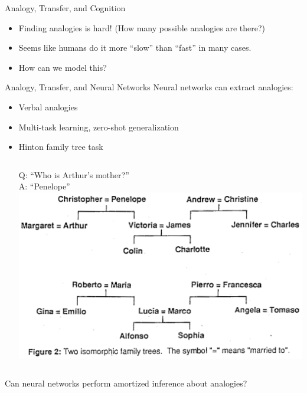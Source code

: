 \documentclass{beamer}
\begin{document}
\begin{frame}{Analogy, Transfer, and Cognition}
\begin{itemize}
    \item<1-> Finding analogies is hard! (How many possible analogies are there?)
    \item<2-> Seems like humans do it more ``slow'' than ``fast'' in many cases. 
    \item<3-> How can we model this?    
\end{itemize}
\end{frame}

\begin{frame}{Analogy, Transfer, and Neural Networks}
Neural networks can extract analogies: 
\begin{itemize}
    \item<2-> Verbal analogies \cite{Kollias2013}
    \item<3-> Multi-task learning, zero-shot generalization \cite{Luong2016,Johnson2016}  
    \item<4-> Hinton family tree task \cite{Hinton1986}
    \begin{columns}
     Q: ``Who is Arthur's mother?'' \\ A: ``Penelope'' %
	\includegraphics[width = \textwidth]{../writing/cogsci_2017/figures/hinton_family_tree_figure.png}
    \end{columns}
\end{itemize}
 {Can neural networks perform amortized inference about analogies?}
\end{frame}
\end{document}
